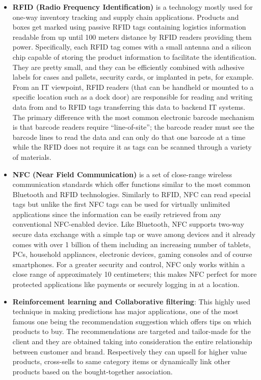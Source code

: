 \begin{itemize}
  \item \textbf{RFID (Radio Frequency Identification) } is a technology mostly used for one-way inventory tracking and supply chain applications. Products and boxes get marked using passive RFID tags containing logistics information readable from up until 100 meters distance by RFID readers providing them power. Specifically, each RFID tag comes with a small antenna and a silicon chip capable of storing the product information to facilitate the identification.  They are pretty small, and they can be efficiently combined with adhesive labels for cases and pallets, security cards, or implanted in pets, for example.  From an IT viewpoint, RFID readers (that can be handheld or mounted to a specific location such as a dock door) are responsible for reading and writing data from and to RFID tags transferring this data to backend IT systems.
  The primary difference with the most common electronic barcode mechanism is that barcode readers require “line-of-site”; the barcode reader must see the barcode lines to read the data and can only do that one barcode at a time while the RFID does not require it as tags can be scanned through a variety of materials.

  \item \textbf{NFC (Near Field Communication)} is a set of close-range wireless communication standards which offer functions similar to the most common Bluetooth and RFID technologies. Similarly to RFID, NFC can read special tags but unlike the first NFC tags can be used for virtually unlimited applications since the information can be easily retrieved from any conventional NFC-enabled device. Like Bluetooth, NFC supports two-way secure data exchange with a simple tap or wave among devices and it already comes with over 1 billion of them including an increasing number of tablets, PCs, household appliances, electronic devices, gaming consoles and of course smartphones. For a greater security and control, NFC only works within a close range of approximately 10 centimeters; this makes NFC perfect for more protected applications like payments or securely logging in at a location. 

  \item \textbf{Reinforcement learning and Collaborative filtering}: This highly used technique in making predictions has major applications, one of the most famous one being the recommendation suggestion which offers tips on which products to buy. The recommendations are targeted and tailor-made for the client and they are obtained taking into consideration the entire relationship between customer and brand. Respectively they can upsell for higher value products, cross-sells to same category items or dynamically link other products based on the bought-together association.
\end{itemize} 

